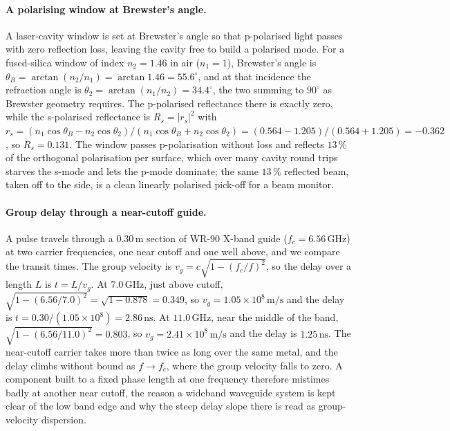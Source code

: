 \paragraph{A polarising window at Brewster's angle.}
A laser-cavity window is set at Brewster's angle so that p-polarised
light passes with zero reflection loss, leaving the cavity free to build
a polarised mode. For a fused-silica window of index $n_2 = 1.46$ in air
($n_1 = 1$), Brewster's angle is $\theta_B = \arctan(n_2/n_1) =
\arctan 1.46 = 55.6^{\circ}$, and at that incidence the refraction angle
is $\theta_2 = \arctan(n_1/n_2) = 34.4^{\circ}$, the two summing to
$90^{\circ}$ as Brewster geometry requires. The p-polarised reflectance
there is exactly zero, while the s-polarised reflectance is $R_s =
|r_s|^{2}$ with $r_s = (n_1\cos\theta_B - n_2\cos\theta_2)/(n_1\cos
\theta_B + n_2\cos\theta_2) = (0.564 - 1.205)/(0.564 + 1.205) = -0.362$,
so $R_s = 0.131$. The window passes p-polarisation without loss and
reflects $13\,\%$ of the orthogonal polarisation per surface, which over
many cavity round trips starves the s-mode and lets the p-mode dominate;
the same $13\,\%$ reflected beam, taken off to the side, is a clean
linearly polarised pick-off for a beam monitor.

\paragraph{Group delay through a near-cutoff guide.}
A pulse travels through a $0.30\,\si{\meter}$ section of WR-90 X-band
guide ($f_c = 6.56\,\si{\giga\hertz}$) at two carrier frequencies, one
near cutoff and one well above, and we compare the transit times. The
group velocity is $v_g = c\sqrt{1-(f_c/f)^2}$, so the delay over a length
$L$ is $t = L/v_g$. At $7.0\,\si{\giga\hertz}$, just above cutoff,
$\sqrt{1-(6.56/7.0)^2} = \sqrt{1-0.878} = 0.349$, so $v_g = 1.05\times
10^{8}\,\si{\meter\per\second}$ and the delay is $t = 0.30/(1.05\times
10^{8}) = 2.86\,\si{\nano\second}$. At $11.0\,\si{\giga\hertz}$, near the
middle of the band, $\sqrt{1-(6.56/11.0)^2} = 0.803$, so $v_g = 2.41
\times 10^{8}\,\si{\meter\per\second}$ and the delay is $1.25\,\si{\nano
\second}$. The near-cutoff carrier takes more than twice as long over the
same metal, and the delay climbs without bound as $f\to f_c$, where the
group velocity falls to zero. A component built to a fixed phase length
at one frequency therefore mistimes badly at another near cutoff, the
reason a wideband waveguide system is kept clear of the low band edge and
why the steep delay slope there is read as group-velocity dispersion.

